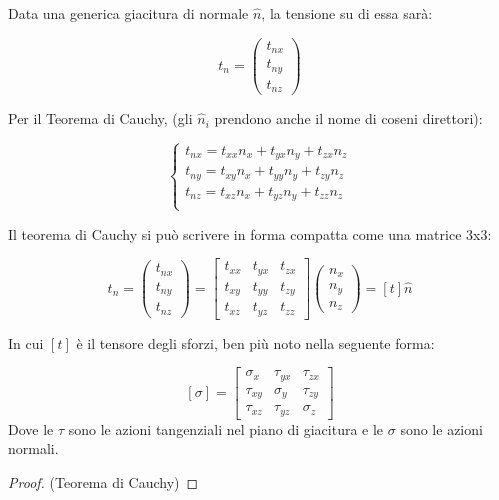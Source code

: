 \documentclass{article}
\begin{document}
\begin{adjustwidth}{2in}{}
	Data una generica giacitura di normale $\hat{n}$, la tensione su di essa sarà:
	
		\[
	t_n = \left( \begin{array}{c}
		t_{nx} \\
		t_{ny} \\
		t_{nz}
	\end{array}\right) 
	\]

	 Per il Teorema di Cauchy, (gli $\hat{n}_i$ prendono anche il nome di coseni direttori): 
	 
	 \[
	 \begin{cases}
		t_{nx} = t_{xx}n_x + t_{yx}n_y + t_{zx}n_z \\
		t_{ny} = t_{xy}n_x + t_{yy}n_y + t_{zy}n_z \\
		t_{nz} = t_{xz}n_x + t_{yz}n_y + t_{zz}n_z \\
	 \end{cases}
	 \]
	 
	 Il teorema di Cauchy si può scrivere in forma compatta come una matrice 3x3:
	 
	 \[
	 	t_n = \left( \begin{array}{c}
	 	t_{nx} \\
	 	t_{ny} \\
	 	t_{nz}
	 \end{array}\right) = \left[ \begin{array}{ccc}
	 t_{xx} & t_{yx} & t_{zx} \\
	 t_{xy} & t_{yy} & t_{zy} \\
	 t_{xz} & t_{yz} & t_{zz}
 \end{array}\right] \left( \begin{array}{c}
 n_x \\
 n_y \\
 n_z
\end{array}\right) = [t] \hat{n}
	 \] 
	 
	 In cui $ [t] $ è il tensore degli sforzi, ben più noto nella seguente forma: 
	 
	 \[
	 [\sigma] = \left[ \begin{array}{ccc}
	 	\sigma_x & \tau_{yx} & \tau_{zx} \\
	 	\tau_{xy} & \sigma_y & \tau_{zy} \\
	 	\tau_{xz} & \tau_{yz} & \sigma_z
	 \end{array}\right]
	 \] 
	 Dove le $\tau$ sono le azioni tangenziali nel piano di giacitura e le $\sigma$ sono le azioni normali. \newpage
\begin{proof}(Teorema di Cauchy)
		 

\end{proof}
\end{adjustwidth}
\end{document}
